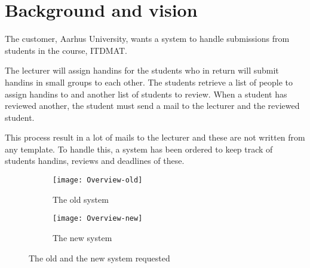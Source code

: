 \documentclass[Main]{subfiles}
\begin{document}
\section{Background and vision}
The customer, Aarhus University, wants a system to handle submissions from students in the course, ITDMAT.

The lecturer will assign handins for the students who in return will submit handins in small groups to each other.
The students retrieve a list of people to assign handins to and another list of students to review.
When a student has reviewed another, the student must send a mail to the lecturer and the reviewed student.

This process result in a lot of mails to the lecturer and these are not written from any template.
To handle this, a system has been ordered to keep track of students handins, reviews and deadlines of these.

\begin{figure}[H]
	\centering
	\begin{subfigure}[b]{0.65\textwidth}
		\texttt{[image: Overview-old]}
		\caption{The old system}
		\label{fig:overview-old}
	\end{subfigure}
	\begin{subfigure}[b]{0.65\textwidth}
		\texttt{[image: Overview-new]}
		\caption{The new system}
		\label{fig:overview-new}
	\end{subfigure}
	\caption{The old and the new system requested}\label{fig:overview}
\end{figure}
\end{document}
